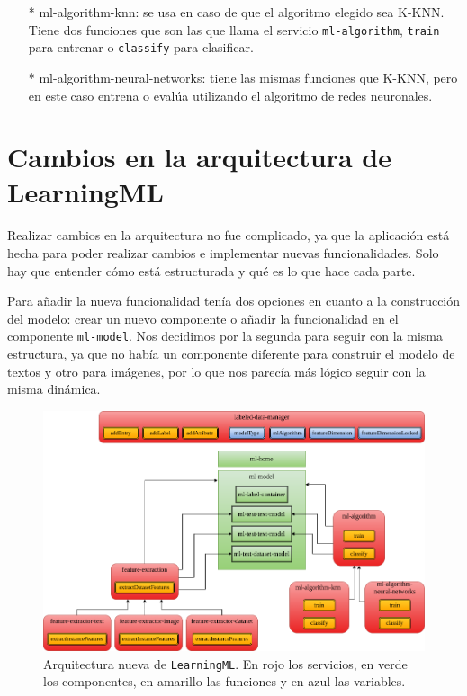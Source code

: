 \documentclass[a4paper, 12pt]{book}
\begin{document}
\begin{itemize}
	\begin{itemize}
		\item[*] ml-algorithm-knn: se usa en caso de que el algoritmo elegido sea K-KNN. 
		Tiene dos funciones que son las que llama el servicio \texttt{ml-algorithm}, \texttt{train} para entrenar o \texttt{classify} para clasificar.
		\item[*] ml-algorithm-neural-networks: tiene las mismas funciones que K-KNN, pero en este caso entrena o evalúa utilizando el algoritmo de redes neuronales.
	\end{itemize}
\end{itemize}

\section{Cambios en la arquitectura de LearningML} 
\label{sec:arquitectura nueva}

Realizar cambios en la arquitectura no fue complicado, ya que la aplicación está hecha para poder realizar cambios e implementar nuevas funcionalidades. 
Solo hay que entender cómo está estructurada y qué es lo que hace cada parte.

Para añadir la nueva funcionalidad tenía dos opciones en cuanto a la construcción del modelo: crear un nuevo componente o añadir la funcionalidad en el componente \texttt{ml-model}. Nos decidimos por la segunda para seguir con la misma estructura, ya que no había un componente diferente para construir el modelo de textos y otro para imágenes, por lo que nos parecía más lógico seguir con la misma dinámica.

\begin{figure}[b!]
	\centering 
	\includegraphics[width=15.5cm, keepaspectratio]{img/arquitectura_nueva.png}
	\caption{Arquitectura nueva de \texttt{LearningML}. En rojo los servicios, en verde los componentes, en amarillo las funciones y en azul las variables.} \label{fig:arquitectura_nueva}
\end{figure}
\end{document}
